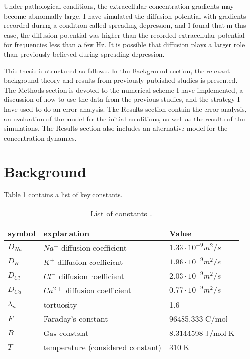 \documentclass{article}
\begin{document}
Under pathological conditions, the extracellular concentration gradients may become abnormally large. I have simulated the diffusion potential with gradients recorded during a condition called spreading depression, and I found that in this case, the diffusion potential was higher than the recorded extracellular potential for frequencies less than a few Hz. It is possible that diffusion plays a larger role than previously believed during spreading depression.

This thesis is structured as follows. In the Background section, the relevant background theory and results from previously published studies is presented. The Methods section is devoted to the numerical scheme I have implemented, a discussion of how to use the data from the previous studies, and the strategy I have used to do an error analysis. The Results section contain the error analysis, an evaluation of the model for the initial conditions, as well as the results of the simulations. The Results section also includes an alternative model for the concentration dynamics. 



\section{Background}
Table \ref{tab:constants} contains a list of key constants.
\begin{table}[h!]
  \centering
  \caption{List of constants \cite{Halnes2016}.}
  \label{tab:constants}
  \begin{tabular}{l||l|l}
symbol & explanation & Value \\
\hline
$D_{Na}$  & $Na^+$ diffusion coefficient & $1.33\cdot 10^{-9}m^2/s$  \\
$D_{K}$  & $K^+$ diffusion coefficient & $1.96\cdot 10^{-9}m^2/s$  \\
$D_{Cl}$  & $Cl^-$ diffusion coefficient & $2.03\cdot 10^{-9}m^2/s$  \\
$D_{Ca}$  & $Ca^{2+}$ diffusion coefficient & $0.77\cdot 10^{-9}m^2/s$  \\
$\lambda_n$ & tortuosity & 1.6 \\
$F$ & Faraday's constant & 	96485.333 C/mol \\ 
$R$ & Gas constant & 8.3144598 J/mol K\\
$T$ & temperature (considered constant)& 310 K\\

 \end{tabular}
\end{table}
\end{document}
